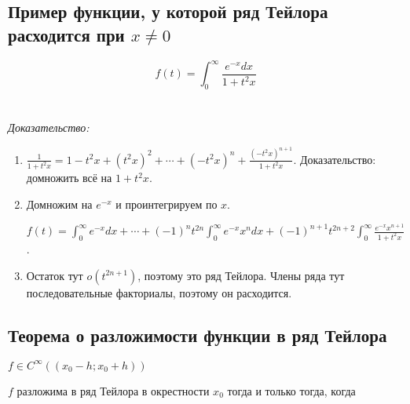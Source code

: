 \documentclass[paper=a4, fontsize=11pt]{article}
\begin{document}
\subsection{Пример функции, у которой ряд Тейлора расходится при $x\ne0$}
$$f(t) = \int_0^{\infty} \frac{e^{-x}dx}{1+t^2x}$$
\\\\
\emph{Доказательство:}
\begin{enumerate}
    \item $\frac{1}{1+t^2x} = 1 - t^2x + (t^2x)^2 + \cdots + (-t^2x)^n + \frac{(-t^2x)^{n+1}}{1+t^2x}$.
    Доказательство: домножить всё на $1+t^2x$.
    \item Домножим на $e^{-x}$ и проинтегрируем по $x$.

    $f(t) = \int_0^{\infty} e^{-x}dx + \cdots + (-1)^nt^{2n}\int_0^{\infty}e^{-x}x^ndx +
    (-1)^{n+1}t^{2n+2}\int_0^{\infty}\frac{e^{-x}x^{n+1}}{1+t^2x}$.
    \item Остаток тут $o(t^{2n+1})$, поэтому это ряд Тейлора. Члены ряда тут последовательные факториалы, поэтому он расходится.
\end{enumerate}

\subsection{Теорема о разложимости функции в ряд Тейлора}
$f \in C^{\infty}((x_0-h;x_0+h))$

$f$ разложима в ряд Тейлора в окрестности $x_0$ тогда и только тогда, когда
\end{document}
